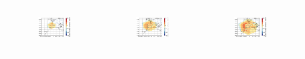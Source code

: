 \begin{figure}[htbp]
\begin{tabular}{ccc}
        \begin{subfigure}[b]{0.33\textwidth}
            \caption{}
            \includegraphics[width=\textwidth]{images/chap4/domain_size/diff_map_LWdnSFC_era_LAM_1000km_NBP40.png}
        \end{subfigure} &
        \begin{subfigure}[b]{0.33\textwidth}
            \caption{}
            \includegraphics[width=\textwidth]{images/chap4/domain_size/diff_map_LWdnSFC_era_LAM_1500km_NBP60.png}
        \end{subfigure} &
        \begin{subfigure}[b]{0.33\textwidth}
            \caption{}
            \includegraphics[width=\textwidth]{images/chap4/domain_size/diff_map_LWdnSFC_era_LAM_2000km_NBP80.png}
        \end{subfigure} \\
        

\end{tabular}
\end{figure}

